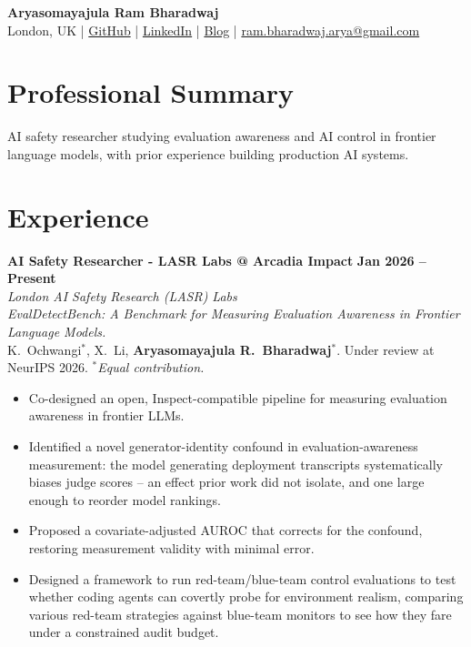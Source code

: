 \documentclass[11pt,a4paper]{article}
\begin{document}
\begin{center}
\textbf{\Large Aryasomayajula Ram Bharadwaj} \\
\vspace{4pt}
London, UK | \href{https://github.com/arbdwj}{GitHub} | \href{https://www.linkedin.com/in/arbharadwaj97/}{LinkedIn} | \href{https://arbdwj.com}{Blog} | \href{mailto:ram.bharadwaj.arya@gmail.com}{ram.bharadwaj.arya@gmail.com}
\end{center}

\vspace{8pt}
\section{Professional Summary}
AI safety researcher studying evaluation awareness and AI control in frontier language models, with prior experience building production AI systems.
\section{Experience}

\textbf{AI Safety Researcher - LASR Labs @ Arcadia Impact} \hfill \textbf{Jan 2026 -- Present} \\
\textit{London AI Safety Research (LASR) Labs} \\[2pt]
\textit{EvalDetectBench: A Benchmark for Measuring Evaluation Awareness in Frontier Language Models.} \\
K.~Ochwangi$^*$, X.~Li, \textbf{Aryasomayajula R.~Bharadwaj}$^*$. Under review at NeurIPS 2026. \textit{$^*$Equal contribution.}
\begin{itemize}[leftmargin=*, nosep]
\item Co-designed an open, Inspect-compatible pipeline for measuring evaluation awareness in frontier LLMs.
\item Identified a novel generator-identity confound in evaluation-awareness measurement: the model generating deployment transcripts systematically biases judge scores -- an effect prior work did not isolate, and one large enough to reorder model rankings.
\item Proposed a covariate-adjusted AUROC that corrects for the confound, restoring measurement validity with minimal error.
\item Designed a framework to run red-team/blue-team control evaluations to test whether coding agents can covertly probe for environment realism, comparing various red-team strategies against blue-team monitors to see how they fare under a constrained audit budget.

\end{itemize}
\end{document}
